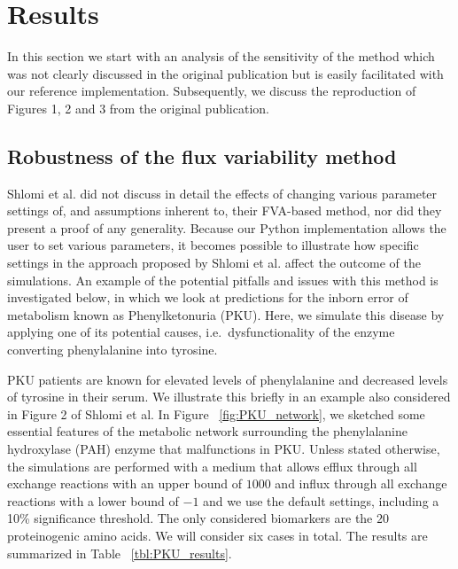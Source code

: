 \documentclass[10pt,a4paper,onecolumn]{article}
\begin{document}
\section{Results}\label{results}

In this section we start with an analysis of the sensitivity of the
method which was not clearly discussed in the original publication but
is easily facilitated with our reference implementation. Subsequently,
we discuss the reproduction of Figures 1, 2 and 3 from the original
publication.

\subsection{Robustness of the flux variability
method}\label{robustness-of-the-flux-variability-method}

Shlomi et al. did not discuss in detail the effects of changing various
parameter settings of, and assumptions inherent to, their FVA-based
method, nor did they present a proof of any generality. Because our
Python implementation allows the user to set various parameters, it
becomes possible to illustrate how specific settings in the approach
proposed by Shlomi et al. affect the outcome of the simulations. An
example of the potential pitfalls and issues with this method is
investigated below, in which we look at predictions for the inborn error
of metabolism known as Phenylketonuria (PKU). Here, we simulate this
disease by applying one of its potential causes, i.e.~dysfunctionality
of the enzyme converting phenylalanine into tyrosine.

PKU patients are known for elevated levels of phenylalanine and
decreased levels of tyrosine in their serum. We illustrate this briefly
in an example also considered in Figure 2 of Shlomi et al. In Figure
~\ref{fig:PKU_network}, we sketched some essential features of the
metabolic network surrounding the phenylalanine hydroxylase (PAH) enzyme
that malfunctions in PKU. Unless stated otherwise, the simulations are
performed with a medium that allows efflux through all exchange
reactions with an upper bound of \(1000\) and influx through all
exchange reactions with a lower bound of \(-1\) and we use the default
settings, including a 10\% significance threshold. The only considered
biomarkers are the \(20\) proteinogenic amino acids. We will consider
six cases in total. The results are summarized in Table
~\ref{tbl:PKU_results}.
\end{document}
